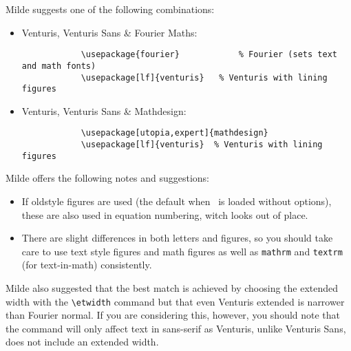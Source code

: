\documentclass[11pt,british]{article}
\begin{document}
Milde suggests one of the following combinations:
\begin{itemize}
	\item Venturis, Venturis Sans \& Fourier Maths:
		\begin{verbatim}
			\usepackage{fourier}			% Fourier (sets text and math fonts)
			\usepackage[lf]{venturis}	% Venturis with lining figures
		\end{verbatim}
	\item Venturis, Venturis Sans \& Mathdesign:
		\begin{verbatim}
			\usepackage[utopia,expert]{mathdesign}
			\usepackage[lf]{venturis}  % Venturis with lining figures
		\end{verbatim}
\end{itemize}

Milde offers the following notes and suggestions:
\begin{itemize}
	\item If oldstyle figures are used (the default when \ is loaded without options), these are also used in equation numbering, witch looks out of place.
	\item There are slight differences in both letters and figures, so you should take care to use text style figures and math figures as well as \verb|mathrm| and \verb|textrm| (for text-in-math) consistently.
\end{itemize}

Milde also suggested that the best match is achieved by choosing the extended width with the \verb|\etwidth| command but that even Venturis extended is narrower than Fourier normal. If you are considering this, however, you should note that the command will only affect text in sans-serif as Venturis, unlike Venturis Sans, does not include an extended width.
\end{document}
